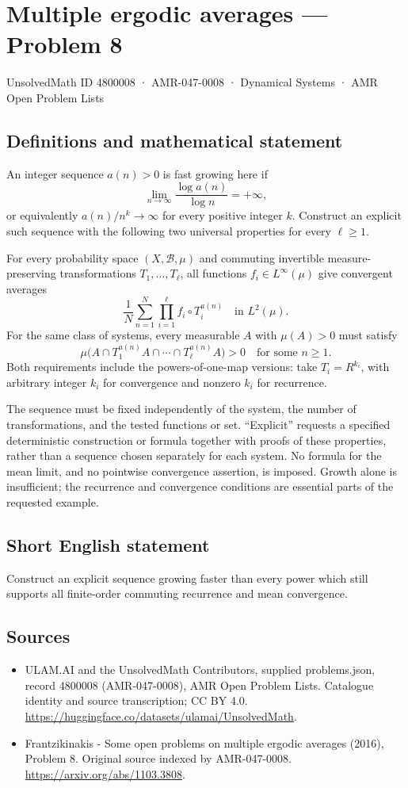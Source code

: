 \documentclass[11pt,a4paper]{article}
\begin{document}
\section*{Multiple ergodic averages — Problem 8}\label{4800008}
{\small UnsolvedMath ID 4800008 · AMR-047-0008 · Dynamical Systems · AMR Open Problem Lists}
\subsection{Definitions and mathematical statement}
An integer sequence $a(n)>0$ is fast growing here if
\[
       \lim_{n\to\infty}\frac{\log a(n)}{\log n}=+\infty,
\]
or equivalently $a(n)/n^k\to\infty$ for every positive
integer $k$. Construct an explicit such sequence with
the following two universal properties for every $\ell\ge1$.

For every probability space $(X,\mathcal B,\mu)$ and
commuting invertible measure-preserving transformations
$T_1,\ldots,T_\ell$, all functions $f_i\in L^\infty(\mu)$
give convergent averages
\[
       \frac1N\sum_{n=1}^N\prod_{i=1}^{\ell}
                     f_i\circ T_i^{a(n)}
                \quad\text{in }L^2(\mu).
\]
For the same class of systems, every measurable $A$ with
$\mu(A)>0$ must satisfy
\[
       \mu\bigl(A\cap T_1^{a(n)}A\cap\cdots
                        \cap T_\ell^{a(n)}A\bigr)>0
       \quad\text{for some }n\ge1.
\]
Both requirements include the powers-of-one-map versions:
take $T_i=R^{k_i}$, with arbitrary integer $k_i$ for
convergence and nonzero $k_i$ for recurrence.

The sequence must be fixed independently of the system,
the number of transformations, and the tested functions
or set. ``Explicit'' requests a specified deterministic
construction or formula together with proofs of these
properties, rather than a sequence chosen separately for
each system. No formula for the mean limit, and no
pointwise convergence assertion, is imposed. Growth alone
is insufficient; the recurrence and convergence conditions
are essential parts of the requested example.
\subsection{Short English statement}
Construct an explicit sequence growing faster than every power which still supports all finite-order commuting recurrence and mean convergence.
\subsection{Sources}
\begin{itemize}
\item[S1] ULAM.AI and the UnsolvedMath Contributors, supplied problems.json, record 4800008 (AMR-047-0008), AMR Open Problem Lists. Catalogue identity and source transcription; CC BY 4.0.
\url{https://huggingface.co/datasets/ulamai/UnsolvedMath}.
\item[S2] Frantzikinakis - Some open problems on multiple ergodic averages (2016), Problem 8. Original source indexed by AMR-047-0008.
\url{https://arxiv.org/abs/1103.3808}.
\end{itemize}
\end{document}
